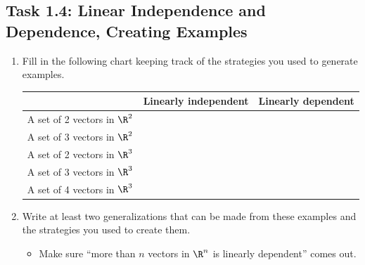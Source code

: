 \documentclass{problemset}
\begin{document}
\begin{iola}
\section*{Task 1.4: Linear Independence and Dependence, Creating Examples}



\begin{enumerate}
	\item Fill in the following chart keeping track of the strategies you used to generate
examples.

\vspace{2mm}

\begin{center}
\begin{tabular}{|c|c|c|}
	\hline
	&Linearly independent & Linearly dependent \\
	\hline
	A set of 2 vectors in $\R^2$ &&\\
	\hline
	A set of 3 vectors in $\R^2$ &&\\
	\hline
	A set of 2 vectors in $\R^3$ &&\\
	\hline
	A set of 3 vectors in $\R^3$ &&\\
	\hline
	A set of 4 vectors in $\R^3$ &&\\
	\hline
\end{tabular}
\end{center}

		\item Write at least two generalizations that can
			be made from these examples and the strategies you
			used to create them.
	\begin{annotation}
		\begin{notes}
			\begin{itemize}
				\item Make sure ``more than $n$ vectors in $\R^n$
					is linearly dependent'' comes out.
			\end{itemize}
		\end{notes}
	\end{annotation}

\end{enumerate}

\end{iola}
\end{document}
